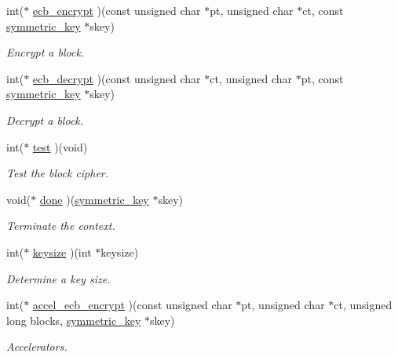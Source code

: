 \begin{DoxyCompactItemize}
int($\ast$ \mbox{\hyperlink{structltc__cipher__descriptor_a46141d86abe22a7c8d382c62a894dd63}{ecb\+\_\+encrypt}} )(const unsigned char $\ast$pt, unsigned char $\ast$ct, const \mbox{\hyperlink{tomcrypt__cipher_8h_ac5a146550efe94c415d95abc7e454362}{symmetric\+\_\+key}} $\ast$skey)
\begin{DoxyCompactList}\small\item\em Encrypt a block. \end{DoxyCompactList}\item 
int($\ast$ \mbox{\hyperlink{structltc__cipher__descriptor_a812d7f58f347982989dc3eace19aba27}{ecb\+\_\+decrypt}} )(const unsigned char $\ast$ct, unsigned char $\ast$pt, const \mbox{\hyperlink{tomcrypt__cipher_8h_ac5a146550efe94c415d95abc7e454362}{symmetric\+\_\+key}} $\ast$skey)
\begin{DoxyCompactList}\small\item\em Decrypt a block. \end{DoxyCompactList}\item 
int($\ast$ \mbox{\hyperlink{structltc__cipher__descriptor_a01a53b4fee754849ad124184a610a4f9}{test}} )(void)
\begin{DoxyCompactList}\small\item\em Test the block cipher. \end{DoxyCompactList}\item 
void($\ast$ \mbox{\hyperlink{structltc__cipher__descriptor_a0ad1c101005c70a69e40fded0e606191}{done}} )(\mbox{\hyperlink{tomcrypt__cipher_8h_ac5a146550efe94c415d95abc7e454362}{symmetric\+\_\+key}} $\ast$skey)
\begin{DoxyCompactList}\small\item\em Terminate the context. \end{DoxyCompactList}\item 
int($\ast$ \mbox{\hyperlink{structltc__cipher__descriptor_a870e4e0c0a4d398d4533724a44259f5f}{keysize}} )(int $\ast$keysize)
\begin{DoxyCompactList}\small\item\em Determine a key size. \end{DoxyCompactList}\item 
int($\ast$ \mbox{\hyperlink{structltc__cipher__descriptor_a150fb7b7247c1a6eb17ff8ba6123221f}{accel\+\_\+ecb\+\_\+encrypt}} )(const unsigned char $\ast$pt, unsigned char $\ast$ct, unsigned long blocks, \mbox{\hyperlink{tomcrypt__cipher_8h_ac5a146550efe94c415d95abc7e454362}{symmetric\+\_\+key}} $\ast$skey)
\begin{DoxyCompactList}\small\item\em Accelerators. \end{DoxyCompactList}\item 

\end{DoxyCompactItemize}
